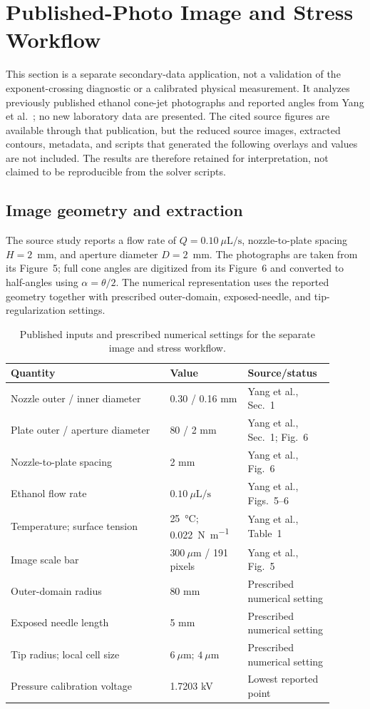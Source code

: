 \section{Published-Photo Image and Stress Workflow}\label{sec:experimental-procedure}

This section is a separate secondary-data application, not a validation of the exponent-crossing diagnostic or a calibrated physical measurement. It analyzes previously published ethanol cone-jet photographs and reported angles from Yang et al.~\cite{yang2025ethanol}; no new laboratory data are presented. The cited source figures are available through that publication, but the reduced source images, extracted contours, metadata, and scripts that generated the following overlays and values are not included. The results are therefore retained for interpretation, not claimed to be reproducible from the solver scripts.

\subsection{Image geometry and extraction}
The source study reports a flow rate of $Q=0.10~\mu\mathrm{L/s}$, nozzle-to-plate spacing $H=2$~mm, and aperture diameter $D=2$~mm. The photographs are taken from its Figure~5; full cone angles are digitized from its Figure~6 and converted to half-angles using $\alpha=\theta/2$. The numerical representation uses the reported geometry together with prescribed outer-domain, exposed-needle, and tip-regularization settings.

\begin{table}[htbp]
\centering
\caption{Published inputs and prescribed numerical settings for the separate image and stress workflow.}\label{tab:public-inputs}
\small
\begin{tabular}{p{0.45\linewidth}p{0.22\linewidth}p{0.23\linewidth}}
\toprule
Quantity & Value & Source/status\\
\midrule
Nozzle outer / inner diameter & 0.30 / 0.16 mm & Yang et al., Sec.~1\\
Plate outer / aperture diameter & 80 / 2 mm & Yang et al., Sec.~1; Fig.~6\\
Nozzle-to-plate spacing & 2 mm & Yang et al., Fig.~6\\
Ethanol flow rate & $0.10~\mu\mathrm{L/s}$ & Yang et al., Figs.~5--6\\
Temperature; surface tension & \SI{25}{\celsius}; \SI{0.022}{\newton\per\meter} & Yang et al., Table~1\\
Image scale bar & $300~\mu$m / 191 pixels & Yang et al., Fig.~5\\
\midrule
Outer-domain radius & 80 mm & Prescribed numerical setting\\
Exposed needle length & 5 mm & Prescribed numerical setting\\
Tip radius; local cell size & $6~\mu$m; $4~\mu$m & Prescribed numerical setting\\
Pressure calibration voltage & 1.7203 kV & Lowest reported point\\
\bottomrule
\end{tabular}
\end{table}

